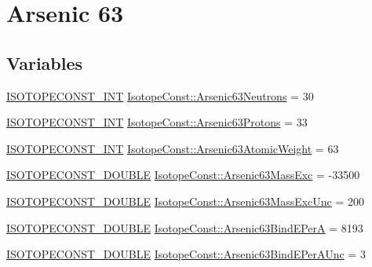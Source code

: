 \hypertarget{group___isotope_const-_arsenic-_as63}{}\section{Arsenic 63}
\label{group___isotope_const-_arsenic-_as63}
\subsection*{Variables}
\begin{DoxyCompactItemize}
\item 
\mbox{\hyperlink{group___isotope_const-_macros_ga5f18360b3e99483a35c32d789e62621c}{I\+S\+O\+T\+O\+P\+E\+C\+O\+N\+S\+T\+\_\+\+I\+NT}} \mbox{\hyperlink{group___isotope_const-_arsenic-_as63_ga74b8f901df5f9ea654972f67cc44ff0b}{Isotope\+Const\+::\+Arsenic63\+Neutrons}} = 30
\item 
\mbox{\hyperlink{group___isotope_const-_macros_ga5f18360b3e99483a35c32d789e62621c}{I\+S\+O\+T\+O\+P\+E\+C\+O\+N\+S\+T\+\_\+\+I\+NT}} \mbox{\hyperlink{group___isotope_const-_arsenic-_as63_gacfd19e22116bdabb14aac3386da834c9}{Isotope\+Const\+::\+Arsenic63\+Protons}} = 33
\item 
\mbox{\hyperlink{group___isotope_const-_macros_ga5f18360b3e99483a35c32d789e62621c}{I\+S\+O\+T\+O\+P\+E\+C\+O\+N\+S\+T\+\_\+\+I\+NT}} \mbox{\hyperlink{group___isotope_const-_arsenic-_as63_gaed6aedc30374644efa9203fdd9486f1e}{Isotope\+Const\+::\+Arsenic63\+Atomic\+Weight}} = 63
\item 
\mbox{\hyperlink{group___isotope_const-_macros_ga8f45a7272ce02c0b4c65c44636ed719a}{I\+S\+O\+T\+O\+P\+E\+C\+O\+N\+S\+T\+\_\+\+D\+O\+U\+B\+LE}} \mbox{\hyperlink{group___isotope_const-_arsenic-_as63_ga133056d432613622d8f0c2b37d52c046}{Isotope\+Const\+::\+Arsenic63\+Mass\+Exc}} = -\/33500
\item 
\mbox{\hyperlink{group___isotope_const-_macros_ga8f45a7272ce02c0b4c65c44636ed719a}{I\+S\+O\+T\+O\+P\+E\+C\+O\+N\+S\+T\+\_\+\+D\+O\+U\+B\+LE}} \mbox{\hyperlink{group___isotope_const-_arsenic-_as63_ga5e3332c1b99d145e8dbe98dcc432a9a5}{Isotope\+Const\+::\+Arsenic63\+Mass\+Exc\+Unc}} = 200
\item 
\mbox{\hyperlink{group___isotope_const-_macros_ga8f45a7272ce02c0b4c65c44636ed719a}{I\+S\+O\+T\+O\+P\+E\+C\+O\+N\+S\+T\+\_\+\+D\+O\+U\+B\+LE}} \mbox{\hyperlink{group___isotope_const-_arsenic-_as63_gaa7dee8a9ced42095bbdae56bf36613e9}{Isotope\+Const\+::\+Arsenic63\+Bind\+E\+PerA}} = 8193
\item 
\mbox{\hyperlink{group___isotope_const-_macros_ga8f45a7272ce02c0b4c65c44636ed719a}{I\+S\+O\+T\+O\+P\+E\+C\+O\+N\+S\+T\+\_\+\+D\+O\+U\+B\+LE}} \mbox{\hyperlink{group___isotope_const-_arsenic-_as63_gacf925ae28d6378b460c0f68ec54844a4}{Isotope\+Const\+::\+Arsenic63\+Bind\+E\+Per\+A\+Unc}} = 3

\end{DoxyCompactItemize}
